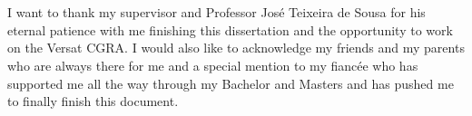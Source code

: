
\section*{\acknowledgments}


I want to thank my supervisor and Professor José Teixeira de Sousa for his eternal patience with me finishing this dissertation
and the opportunity to work on the Versat CGRA.
I would also like to acknowledge my friends and my parents who are always there for me and a special mention 
to my fiancée who has supported me all the way through my Bachelor and Masters and has pushed me to finally finish this document.

